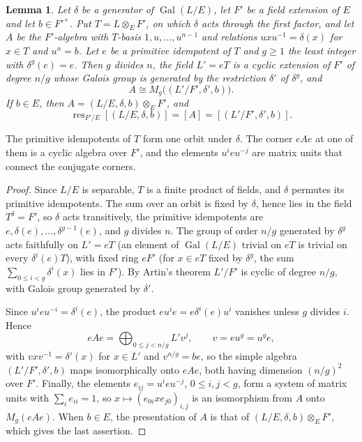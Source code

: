 \documentclass[a4paper,11pt]{amsart}
\newtheorem{lemma}[theorem]{Lemma}
\theoremstyle{definition}
\theoremstyle{remark}
\numberwithin{equation}{section}
\DeclareMathOperator{\res}{res}
\DeclareMathOperator{\Gal}{Gal}
\begin{document}
\begin{lemma}\label{lem:corners}
Let $\delta$ be a generator of $\Gal(L/E)$, let $F'$ be a field extension of $E$ and let $b\in F'^\times$. Put $T=L\otimes_EF'$, on which $\delta$ acts through the first factor, and let $A$ be the $F'$-algebra with $T$-basis $1,u,\dots,u^{n-1}$ and relations $uxu^{-1}=\delta(x)$ for $x\in T$ and $u^n=b$. Let $e$ be a primitive idempotent of $T$ and $g\geq1$ the least integer with $\delta^g(e)=e$. Then $g$ divides $n$, the field $L'=eT$ is a cyclic extension of $F'$ of degree $n/g$ whose Galois group is generated by the restriction $\delta'$ of $\delta^g$, and
\[
 A\cong M_g\bigl((L'/F',\delta',b)\bigr).
\]
If $b\in E$, then $A=(L/E,\delta,b)\otimes_EF'$, and
\[
 \res_{F'/E}[(L/E,\delta,b)]=[A]=[(L'/F',\delta',b)].
\]
\end{lemma}

The primitive idempotents of $T$ form one orbit under $\delta$. The corner $eAe$ at one of them is a cyclic algebra over $F'$, and the elements $u^ieu^{-j}$ are matrix units that connect the conjugate corners.

\begin{proof}
Since $L/E$ is separable, $T$ is a finite product of fields, and $\delta$ permutes its primitive idempotents. The sum over an orbit is fixed by $\delta$, hence lies in the field $T^\delta=F'$, so $\delta$ acts transitively, the primitive idempotents are $e,\delta(e),\dots,\delta^{g-1}(e)$, and $g$ divides $n$. The group of order $n/g$ generated by $\delta^g$ acts faithfully on $L'=eT$ (an element of $\Gal(L/E)$ trivial on $eT$ is trivial on every $\delta^i(e)T$), with fixed ring $eF'$ (for $x\in eT$ fixed by $\delta^g$, the sum $\sum_{0\leq i<g}\delta^i(x)$ lies in $F'$). By Artin's theorem $L'/F'$ is cyclic of degree $n/g$, with Galois group generated by $\delta'$.

Since $u^ieu^{-i}=\delta^i(e)$, the product $eu^ie=e\delta^i(e)u^i$ vanishes unless $g$ divides $i$. Hence
\[
 eAe=\bigoplus_{0\leq j<n/g}L'v^j,\qquad v=eu^g=u^ge,
\]
with $vxv^{-1}=\delta'(x)$ for $x\in L'$ and $v^{n/g}=be$, so the simple algebra $(L'/F',\delta',b)$ maps isomorphically onto $eAe$, both having dimension $(n/g)^2$ over $F'$. Finally, the elements $e_{ij}=u^ieu^{-j}$, $0\leq i,j<g$, form a system of matrix units with $\sum_ie_{ii}=1$, so $x\mapsto(e_{0i}xe_{j0})_{i,j}$ is an isomorphism from $A$ onto $M_g(eAe)$. When $b\in E$, the presentation of $A$ is that of $(L/E,\delta,b)\otimes_EF'$, which gives the last assertion.
\end{proof}
\end{document}
